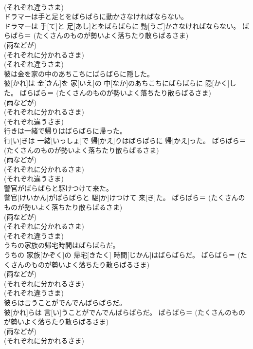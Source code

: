 \documentclass[8pt]{extreport}
\begin{document}
\begin{CJK}{UTF8}{min}
{\\	(それぞれ違うさま) 
\\	ドラマーは手と足とをばらばらに動かさなければならない。	
\\	ドラマーは 手[て]と 足[あし]とをばらばらに 動[うご]かさなければならない。	ばらばら＝ (たくさんのものが勢いよく落ちたり散らばるさま) 
\\	(雨などが) 
\\	(それぞれに分かれるさま) 
\\	(それぞれ違うさま) 
\\	彼は金を家の中のあちこちにばらばらに隠した。	
\\	彼[かれ]は 金[きん]を 家[いえ]の 中[なか]のあちこちにばらばらに 隠[かく]した。	ばらばら＝ (たくさんのものが勢いよく落ちたり散らばるさま) 
\\	(雨などが) 
\\	(それぞれに分かれるさま) 
\\	(それぞれ違うさま) 
\\	行きは一緒で帰りはばらばらに帰った。	
\\	行[い]きは 一緒[いっしょ]で 帰[かえ]りはばらばらに 帰[かえ]った。	ばらばら＝ (たくさんのものが勢いよく落ちたり散らばるさま) 
\\	(雨などが) 
\\	(それぞれに分かれるさま) 
\\	(それぞれ違うさま) 
\\	警官がばらばらと駆けつけて来た。	
\\	警官[けいかん]がばらばらと 駆[か]けつけて 来[き]た。	ばらばら＝ (たくさんのものが勢いよく落ちたり散らばるさま) 
\\	(雨などが) 
\\	(それぞれに分かれるさま) 
\\	(それぞれ違うさま) 
\\	うちの家族の帰宅時間はばらばらだ。	
\\	うちの 家族[かぞく]の 帰宅[きたく] 時間[じかん]はばらばらだ。	ばらばら＝ (たくさんのものが勢いよく落ちたり散らばるさま) 
\\	(雨などが) 
\\	(それぞれに分かれるさま) 
\\	(それぞれ違うさま) 
\\	彼らは言うことがでんでんばらばらだ。	
\\	彼[かれ]らは 言[い]うことがでんでんばらばらだ。	ばらばら＝ (たくさんのものが勢いよく落ちたり散らばるさま) 
\\	(雨などが) 
\\	(それぞれに分かれるさま) 
}
\end{CJK}
\end{document}
